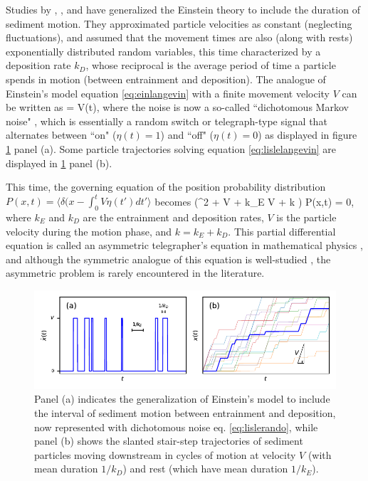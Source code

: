 Studies by \citet{Gordon1972}, \citet{Lisle1998}, and \citet{Lajeunesse2017} have generalized the Einstein theory to include the duration of sediment motion. They approximated particle velocities as constant (neglecting fluctuations), and assumed that the movement times are also (along with rests) exponentially distributed random variables, this time characterized by a deposition rate $k_D$, whose reciprocal is the average period of time a particle spends in motion (between entrainment and deposition).
The analogue of Einstein's model equation \ref{eq:einlangevin} with a finite movement velocity $V$ can be written as
\be {} = V\eta(t), \ee
where the noise is now a so-called ``dichotomous Markov noise" \citep{Bena2006}, which is essentially a random switch or telegraph-type signal that alternates between ``on" ($\eta(t) = 1$) and ``off" ($\eta(t) = 0$) \citep{Cox1965,Horsthemke1984, Masoliver1991, Masoliver1996} as displayed in figure \ref{fig:lislefig} panel (a). Some particle trajectories solving equation \ref{eq:lislelangevin} are displayed in \ref{fig:lislefig} panel (b).

This time, the governing equation of the position probability distribution $P(x,t) = \langle \delta(x-\int_0^t V\eta(t')dt' \rangle$ becomes \citep{Balakrishnan1993}
\be \big(\pt^2 + V \px \pt + k_E V \px + k \pt \big) P(x,t) = 0,\ee
where $k_E$ and $k_D$ are the entrainment and deposition rates, $V$ is the particle velocity during the motion phase, and $k = k_E+k_D$. This partial differential equation is called an asymmetric telegrapher's equation in mathematical physics \citep{Rossetto2018}, and although the symmetric analogue of this equation is well-studied \citep{Weiss2002a, Masoliver2017}, the asymmetric problem is rarely encountered in the literature.

\begin{figure}[!htbp]
	\includegraphics[width=\linewidth,keepaspectratio]{./figures/ch1/lisleConcept.pdf}
	\caption{Panel (a) indicates the generalization of Einstein's model to include the interval of sediment motion between entrainment and deposition, now represented with dichotomous noise eq. \ref{eq:lislerando}, while panel (b) shows the slanted stair-step trajectories of sediment particles moving downstream in cycles of motion at velocity $V$ (with mean duration $1/k_D$) and rest (which have mean duration $1/k_E$). }
	\label{fig:lislefig}
\end{figure}


